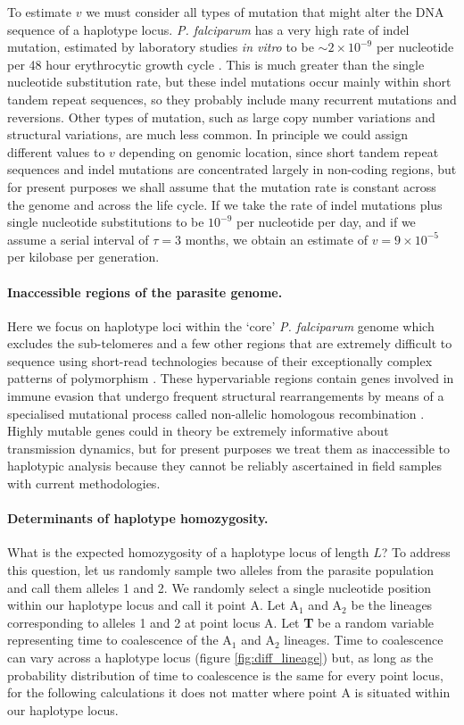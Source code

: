 \documentclass[_main.tex]{subfiles}
\begin{document}
To estimate $v$ we must consider all types of mutation that might alter the DNA sequence of a haplotype locus.  \textit{P. falciparum} has a very high rate of indel mutation, estimated by laboratory studies \textit{in vitro} to be $\sim 2 \times 10^{-9}$ per nucleotide per 48 hour erythrocytic growth cycle \cite{Hamilton2016}.  This is much greater than the single nucleotide substitution rate, but these indel mutations occur mainly within short tandem repeat sequences, so they probably include many recurrent mutations and reversions.  Other types of mutation, such as large copy number variations and structural variations, are much less common.  In principle we could assign different values to $v$ depending on genomic location, since short tandem repeat sequences and indel mutations are concentrated largely in non-coding regions, but for present purposes we shall assume that the mutation rate is constant across the genome and across the life cycle.  If we take the rate of indel mutations plus single nucleotide substitutions to be $10^{-9}$ per nucleotide per day, and if we assume a serial interval of $\tau = 3$ months, we obtain an estimate of $v = 9 \times 10^{-5}$ per kilobase per generation.

\paragraph{Inaccessible regions of the parasite genome.}  Here we focus on haplotype loci within the `core' \textit{P. falciparum} genome which excludes the sub-telomeres and a few other regions that are extremely difficult to sequence using short-read technologies because of their exceptionally complex patterns of polymorphism \cite{Miles2016}.  These hypervariable regions contain genes involved in immune evasion that undergo frequent structural rearrangements by means of a specialised mutational process called non-allelic homologous recombination \cite{Claessens2014}.  Highly mutable genes could in theory be extremely informative about transmission dynamics, but for present purposes we treat them as inaccessible to haplotypic analysis because they cannot be reliably ascertained in field samples with current methodologies. 

\paragraph{Determinants of haplotype homozygosity.}  
\label{main_haplotype_homozygosity} What is the expected homozygosity of a haplotype locus of length $L$?  To address this question, let us randomly sample two alleles from the parasite population and call them alleles 1 and 2.  We randomly select a single nucleotide position within our haplotype locus and call it point A.  Let $\text{A}_1$ and $\text{A}_2$ be the lineages corresponding to alleles 1 and 2 at point locus A.  Let \textbf{T} be a random variable representing time to coalescence of the $\text{A}_1$ and $\text{A}_2$ lineages.   Time to coalescence can vary across a haplotype locus (figure \ref{fig:diff_lineage}) but, as long as the probability distribution of time to coalescence is the same for every point locus, for the following calculations it does not matter where point A is situated within our haplotype locus.
\end{document}
